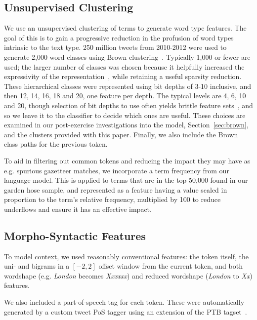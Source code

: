 \documentclass[11pt|a4paper]{article}
\begin{document}
\subsection{Unsupervised Clustering}
We use an unsupervised clustering of terms to generate word type features.
The goal of this is to gain a progressive reduction in the profusion of word types intrinsic to the text type.
250 million tweets from 2010-2012 were used to generate 2,000 word classes using Brown clustering~\cite{brown-cl92}.
Typically 1,000 or fewer are used; the larger number of classes was chosen because it helpfully increased the expressivity of the representation~\cite{derczynski2015brown}, while retaining a useful sparsity reduction.
These hierarchical classes were represented using bit depths of 3-10 inclusive, and then 12, 14, 16, 18 and 20, one feature per depth.
The typical levels are 4, 6, 10 and 20, though selection of bit depths to use often yields brittle feature sets~\cite{koo}, and so we leave it to the classifier to decide which ones are useful. 
These choices are examined in our post-exercise investigations into the model, Section~\ref{sec:brown}, and the clusters provided with this paper.
Finally, we also include the Brown class paths for the previous token.

To aid in filtering out common tokens and reducing the impact they may have as e.g. spurious gazetteer matches, we incorporate a term frequency from our language model.
This is applied to terms that are in the top 50,000 found in our garden hose sample, and represented as a feature having a value scaled in proportion to the term's relative frequency, multiplied by 100 to reduce underflows and ensure it has an effective impact.


\subsection{Morpho-Syntactic Features}
To model context, we used reasonably conventional features: the token itself, the uni- and bigrams in a $[-2,2]$ offset window from the current token, and both wordshape (e.g. {\em London} becomes {\em Xxxxxx}) and reduced wordshape ({\em London} to {\em Xx}) features.

We also included a part-of-speech tag for each token.
These were automatically generated by a custom tweet PoS tagger using an extension of the PTB tagset~\cite{Derczynski2013c}.
\end{document}
